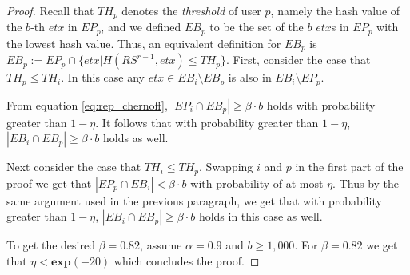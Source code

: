 \begin{proof}
Recall that $TH_p$ denotes the \textit{threshold} of user $p$, namely the hash value of the $b$-th $etx$ in $EP_p$, and we defined $EB_p$ to be the set of the $b$ $etx$s in $EP_p$ with the lowest hash value. Thus, an equivalent definition for $EB_p$ is $EB_p:=EP_p\cap \{etx|H(RS^{r-1},etx)\leq TH_p\}$. 
First, consider the case that $TH_p\leq TH_i$. In this case any $etx\in EB_i\setminus EB_p$ is also in $EB_i\setminus EP_p$. 

From equation \ref{eq:rep_chernoff}, $|EP_i\cap EB_p|\geq \beta\cdot b$ holds with probability greater than $1-\eta$.  It follows that with probability greater than $1-\eta$,  $|EB_i\cap EB_p|\geq \beta \cdot b$ holds as well. 


Next consider the case that $TH_i\leq TH_p$. Swapping $i$ and $p$ in the first part of the proof we get that $|EP_p\cap EB_i|< \beta \cdot b$ with probability of at most $\eta$. Thus by the same argument used in the previous paragraph, we get that with probability greater than $1-\eta$, $|EB_i\cap EB_p|\geq \beta \cdot b$ holds in this case as well.

To get the desired $\beta=0.82$, assume $\alpha=0.9$ and $b\geq 1,000$. For $\beta=0.82$ we get that $\eta<\textbf{exp}(-20)$ which concludes the proof. 
    \end{proof}
    
